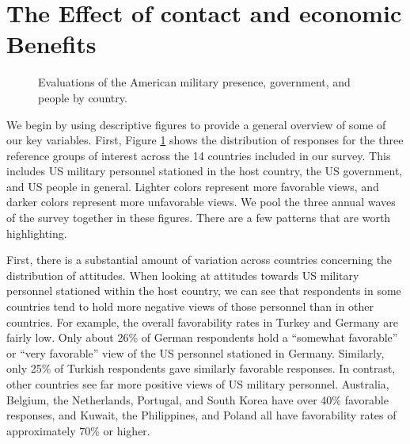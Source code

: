 \section*{The Effect of contact and economic Benefits}


\begin{figure}[t]
	\centering{}
	\caption{Evaluations of the American military presence, government, and people by country.}
	\label{fig:dvdesc}
\end{figure} %

We begin by using descriptive figures to provide a general overview of some of our key variables. First, Figure \ref{fig:dvdesc} shows the distribution of responses for the three reference groups of interest across the 14 countries included in our survey. This includes US military personnel stationed in the host country, the US government, and US people in general. Lighter colors represent more favorable views, and darker colors represent more unfavorable views. We pool the three annual waves of the survey together in these figures. There are a few patterns that are worth highlighting. 

First, there is a substantial amount of variation across countries concerning the distribution of attitudes. When looking at attitudes towards US military personnel stationed within the host country, we can see that respondents in some countries tend to hold more negative views of those personnel than in other countries. For example, the overall favorability rates in Turkey and Germany are fairly low. Only about 26\% of German respondents hold a ``somewhat favorable'' or ``very favorable'' view of the US personnel stationed in Germany. Similarly, only 25\% of Turkish respondents gave similarly favorable responses. In contrast, other countries see far more positive views of US military personnel. Australia, Belgium, the Netherlands, Portugal, and South Korea have over 40\% favorable responses, and Kuwait, the Philippines, and Poland all have favorability rates of approximately 70\% or higher. 

